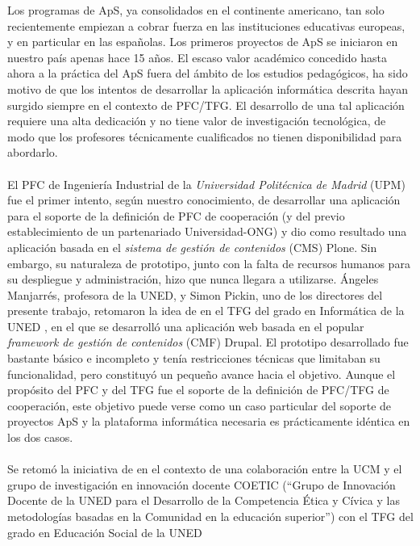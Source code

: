 \documentclass[11pt]{book}
\begin{document}
Los programas de ApS, ya consolidados en el continente americano, tan
solo recientemente empiezan a cobrar fuerza en las instituciones
educativas europeas, y en particular en las españolas. Los primeros
proyectos de ApS se iniciaron en nuestro país apenas hace 15 años.  El
escaso valor académico concedido hasta ahora a la práctica del ApS fuera
del ámbito de los estudios pedagógicos, ha sido motivo de que los
intentos de desarrollar la aplicación informática descrita hayan surgido
siempre en el contexto de PFC/TFG. El desarrollo de una tal aplicación
requiere una alta dedicación y no tiene valor de investigación
tecnológica, de modo que los profesores técnicamente cualificados no
tienen disponibilidad para abordarlo.\\\\

El PFC de Ingeniería Industrial de la
\emph{Universidad Politécnica de Madrid} (UPM) \cite{ref1} fue el primer intento, según
nuestro conocimiento, de desarrollar una aplicación para el soporte de
la definición de PFC de cooperación (y del previo establecimiento de un
partenariado Universidad-ONG) y dio como resultado una aplicación basada
en el \emph{sistema de gestión de contenidos} (CMS) Plone. Sin embargo, su
naturaleza de prototipo, junto con la falta de recursos humanos para su
despliegue y administración, hizo que nunca llegara a utilizarse.
Ángeles Manjarrés, profesora de la UNED, y Simon Pickin, uno de los directores del presente
trabajo, retomaron la idea de \cite{ref1} en el TFG del grado en Informática de
la UNED \cite{ref2}, en el que se desarrolló una aplicación web basada en el
popular \emph{framework de gestión de contenidos} (CMF) Drupal. El prototipo
desarrollado fue bastante básico e incompleto y tenía restricciones
técnicas que limitaban su funcionalidad, pero constituyó un pequeño
avance hacia el objetivo. Aunque el propósito del PFC \cite{ref1} y del TFG \cite{ref2}
fue el soporte de la definición de PFC/TFG de cooperación, este objetivo
puede verse como un caso particular del soporte de proyectos ApS y la
plataforma informática necesaria es prácticamente idéntica en los dos casos.
\\\\
Se retomó la iniciativa de \cite{ref2} en el contexto de una colaboración entre
la UCM y el grupo de investigación en innovación docente COETIC (“Grupo
de Innovación Docente de la UNED para el Desarrollo de la Competencia
Ética y Cívica y las metodologías basadas en la Comunidad en la
educación superior”) con el TFG del grado en Educación Social de la UNED
\end{document}

